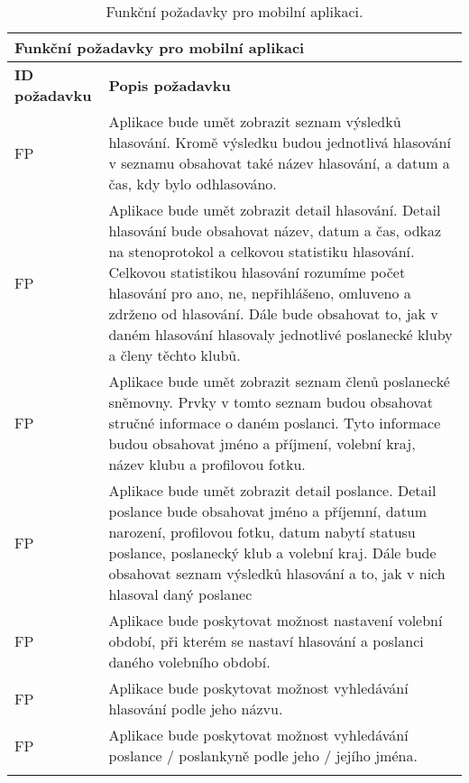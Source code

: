 \def\arraystretch{1.5}
\begin{longtable}{|l|p{9cm}|} \hline
	\multicolumn{2}{|l|}{\textbf{Funkční požadavky pro mobilní aplikaci}} \\ \hline
	
	\textbf{ID požadavku} & \textbf{Popis požadavku} \\ \hline
	
	FP\textunderscore01	& Aplikace bude umět zobrazit seznam výsledků hlasování. Kromě výsledku budou jednotlivá hlasování v seznamu obsahovat také název hlasování, a datum a čas, kdy bylo odhlasováno. \\ \hline
	
	FP\textunderscore02	& Aplikace bude umět zobrazit detail hlasování. Detail hlasování bude obsahovat název, datum a čas, odkaz na stenoprotokol a celkovou statistiku hlasování. Celkovou statistikou hlasování rozumíme počet hlasování pro ano, ne, nepřihlášeno, omluveno a zdrženo od hlasování. Dále bude obsahovat to, jak v daném hlasování hlasovaly jednotlivé poslanecké kluby a členy těchto klubů. \\ \hline
	
	FP\textunderscore03	& Aplikace bude umět zobrazit seznam členů poslanecké sněmovny. Prvky v tomto seznam budou obsahovat stručné informace o daném poslanci. Tyto informace budou obsahovat jméno a příjmení, volební kraj, název klubu a profilovou fotku. \\ \hline
	
	FP\textunderscore04	& Aplikace bude umět zobrazit detail poslance. Detail poslance bude obsahovat jméno a příjemní, datum narození, profilovou fotku, datum nabytí statusu poslance, poslanecký klub a volební kraj. Dále bude obsahovat seznam výsledků hlasování a to, jak v nich hlasoval daný poslanec\\ \hline
	
	FP\textunderscore05	& Aplikace bude poskytovat možnost nastavení volební období, při kterém se nastaví hlasování a poslanci daného volebního období.\\ \hline
	
	FP\textunderscore06	& Aplikace bude poskytovat možnost vyhledávání hlasování podle jeho názvu.\\ \hline
	
	FP\textunderscore07	& Aplikace bude poskytovat možnost vyhledávání poslance / poslankyně podle jeho / jejího jména.\\ \hline
	
	\caption{Funkční požadavky pro mobilní aplikaci.}
	\label{table:func_req_app}
\end{longtable}



